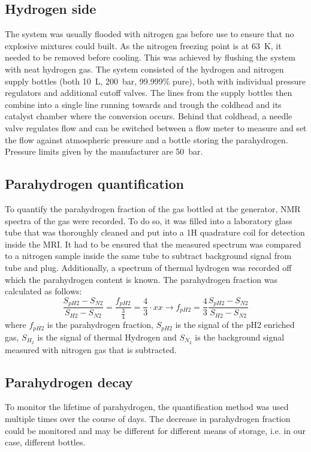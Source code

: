         \subsection{Hydrogen side}
            The system was usually flooded with nitrogen gas before use to ensure that no explosive mixtures could built. As the nitrogen freezing point is at \SI{63}{\kelvin}, it needed to be removed before cooling. This was achieved by flushing the system with neat hydrogen gas. The system consisted of the hydrogen and nitrogen supply bottles (both \SI{10}{\liter}, \SI{200}{\bar}, 99.999\% pure), both with individual pressure regulators and additional cutoff valves. The lines from the supply bottles then combine into a single line running towards and trough the coldhead and its catalyst chamber where the conversion occurs. Behind that coldhead, a needle valve regulates flow and can be switched between a flow meter to measure and set the flow against atmospheric pressure and a bottle storing the parahydrogen. Pressure limits given by the manufacturer are \SI{50}{\bar}. 
        \subsection{Parahydrogen quantification}
            To quantify the parahydrogen fraction of the gas bottled at the generator, NMR spectra of the gas were recorded. To do so, it was filled into a laboratory glass tube that was thoroughly cleaned and put into a 1H quadrature coil for detection inside the MRI. It had to be ensured that the measured spectrum was compared to a nitrogen sample inside the same tube to subtract background signal from tube and plug. Additionally, a spectrum of thermal hydrogen was recorded off which the parahydrogen content is known. The parahydrogen fraction was calculated as follows:
            \begin{equation}
                \frac{S_{pH2}-S_{N2}}{S_{H2}-S_{N2}} = \frac{f_{pH2}}{\tfrac{3}{4}} = \frac{4}{3} \cdot xx \rightarrow f_{pH2} = \frac{4}{3} \frac{S_{pH2}-S_{N2}}{S_{H2}-S_{N2}}
            \end{equation}
            where $f_{pH2}$ is the parahydrogen fraction, $S_{pH2}$ is the signal of the pH2 enriched gas, $S_{H_2}$ is the signal of thermal Hydrogen and $S_{N_2}$ is the background signal measured with nitrogen gas that is subtracted.
        \subsection{Parahydrogen decay}
            To monitor the lifetime of parahydrogen, the quantification method was used multiple times over the course of days. The decrease in parahydrogen fraction could be monitored and may be different for different means of storage, i.e. in our case, different bottles.
